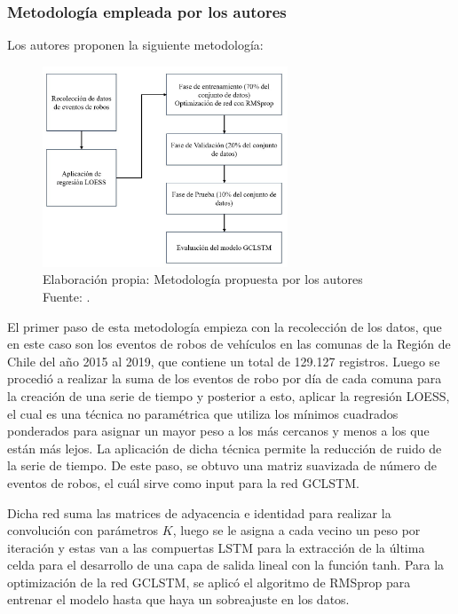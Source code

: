 \subsubsection{Metodología empleada por los autores}
Los autores proponen la siguiente metodología: %


\begin{figure}[h]
	\begin{center}
		\includegraphics[width=0.65\textwidth]{2/figures/ChileMetodo.jpg}
		\caption{Elaboración propia: Metodología propuesta por los autores \\
			Fuente: \citep*{pr_esquivel}. }
		\label{1:fig2}
	\end{center}
\end{figure}
El primer paso de esta metodología empieza con la recolección de los datos, que en este caso son los eventos de robos de vehículos en las comunas de la Región de Chile del año 2015 al 2019, que contiene un total de 129.127 registros. Luego se procedió a realizar la suma de los eventos de robo por día de cada comuna para la creación de una serie de tiempo y posterior a esto, aplicar la regresión LOESS, el cual es una técnica no paramétrica que utiliza los mínimos cuadrados ponderados para asignar un mayor peso a los más cercanos y menos a los que están más lejos. La aplicación de dicha técnica permite la reducción de ruido de la serie de tiempo. De este paso, se obtuvo una matriz suavizada de número de eventos de robos, el cuál sirve como input para la red GCLSTM. 

Dicha red suma las matrices de adyacencia e identidad para realizar la convolución con parámetros $K$, luego se le asigna a cada vecino un peso por iteración y estas van a las compuertas LSTM para la extracción de la última celda para el desarrollo de una capa de salida lineal con la función tanh. Para la optimización de la red GCLSTM, se aplicó el algoritmo de RMSprop para entrenar el modelo hasta que haya un sobreajuste en los datos.

